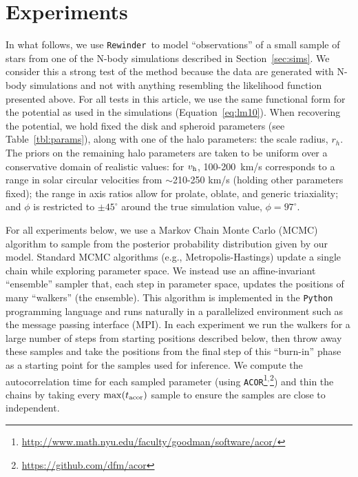 \documentclass{emulateapj}
\newcommand{\vhalo}{v_{\rm h}}
\newcommand{\rewinder}{\texttt{Rewinder}}
\begin{document}
\section{Experiments} \label{sec:experiments}
In what follows, we use \rewinder\ to model ``observations'' of a small sample of stars from one of the N-body simulations described in Section~\ref{sec:sims}. We consider this a strong test of the method because the data are generated with N-body simulations and not with anything resembling the likelihood function presented above. For all tests in this article, we use the same functional form for the potential as used in the simulations (Equation~\ref{eq:lm10}). When recovering the potential, we hold fixed the disk and spheroid parameters (see Table~\ref{tbl:params}), along with one of the halo parameters: the scale radius, $r_h$. The priors on the remaining halo parameters are taken to be uniform over a conservative domain of realistic values: for $\vhalo$, 100-200~km/s corresponds to a range in solar circular velocities from $\sim$210-250 km/s (holding other parameters fixed); the range in axis ratios allow for prolate, oblate, and generic triaxiality; and $\phi$ is restricted to $\pm45^\circ$ around the true simulation value, $\phi = 97^\circ$.

For all experiments below, we use a Markov Chain Monte Carlo (MCMC) algorithm to sample from the posterior probability distribution given by our model. Standard MCMC algorithms (e.g., Metropolis-Hastings) update a single chain while exploring parameter space. We instead use an affine-invariant ``ensemble'' sampler \citep{goodman10} that, each step in parameter space, updates the positions of many ``walkers'' (the ensemble). This algorithm is implemented in the \texttt{Python} programming language \citep{foremanmackey13} and runs naturally in a parallelized environment such as the message passing interface (MPI). In each experiment we run the walkers for a large number of steps from starting positions described below, then throw away these samples and take the positions from the final step of this ``burn-in'' phase as a starting point for the samples used for inference. We compute the autocorrelation time for each sampled parameter (using \texttt{ACOR}\footnote{\url{http://www.math.nyu.edu/faculty/goodman/software/acor/}}$^{,}$\footnote{\url{https://github.com/dfm/acor}}) and thin the chains by taking every $\mathrm{max}(t_{\rm acor})$ sample to ensure the samples are close to independent.
\end{document}
